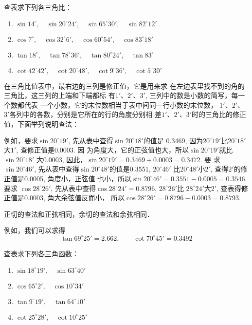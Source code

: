 \begin{ex}
    查表求下列各三角比：
\begin{enumerate}
    \item $\sin14^{\circ},\quad \sin20^{\circ}24',\quad \sin65^{\circ}30',\quad \sin82^{\circ}12'$
    \item $\cos7^{\circ},\quad  \cos32^{\circ}6',\quad  \cos60^{\circ}54',\quad \cos83^{\circ}18'$
    \item $\tan 18^{\circ},\quad  \tan 78^{\circ}36',\quad  \tan 80^{\circ}24',\quad  \tan 83^{\circ}$
    \item $\cot 42^{\circ}42',\quad   \cot20^{\circ}48', \quad  \cot9^{\circ}36', \quad  \cot 5^{\circ}30'$
\end{enumerate}
\end{ex}

在三角比值表中，最右边的三列是修正值，它是用来求
在左边表里找不到的角的三角比，这三列的上端和下端都标
有$1'$、$2'$、$3'$, 三列中的数是小数的简写，每一个数都代表
一个小数，它的末位数相当于表中间同一行小数的末位数，
$1'$、$2'$、$3'$各列中的各数，分别是它所在的行的角度分别相
差$1'$、$2'$、$3'$时的三角比的修正值，下面举列说明查法：

例如，要求$\sin20^{\circ}19'$, 先从表中查得$\sin20^{\circ}18'$的值是
0.3469, 因为$20^{\circ}19'$比$20^{\circ}18'$大$1'$, 查修正值是0.0003. 因
为角度大，它的正弦值也大，所以$\sin20^{\circ}19'$就比$\sin20^{\circ}18'$
大0.0003, 因此，$\sin20^{\circ}19'=0.3469+0.0003=0.3472$. 要
求$\sin20^{\circ}46'$, 先从表中查得$\sin20^{\circ}48'$的值是0.3551, $20^{\circ}46'$
比$20^{\circ}48'$小$2'$, 查得$2'$的修正值是0.0005, 角度小，正弦值
也小，所以$\sin20^{\circ}46'=0.3551-0.0005=0.3546$. 要求
$\cos28^{\circ}26'$, 先从表中查得$\cos28^{\circ}24'=0.8796$, $28^{\circ}26'$比
$28^{\circ}24'$大$2'$, 查表得修正值是0.0003, 角大余弦值反而小，
所以$\cos28^{\circ}26'=0.8796-0.0003=0.8793$. 

正切的查法和正弦相同，余切的查法和余弦相同．

例如，我们可以求得
\[\tan 69^{\circ}25'=2.662,\qquad \cot 70^{\circ}45'=0.3492\]

\begin{ex}
    查表求下列各三角函数：
\begin{multicols}{2}
    \begin{enumerate}
        \item $\sin18^{\circ}19',\quad  \sin63^{\circ}40'$
        \item $\cos65^{\circ}2',\quad  \cos10^{\circ}34'$
        \item $\tan 9^{\circ}19',\quad  \tan64^{\circ}10'$
        \item $\cot25^{\circ}28',\quad  \cot10^{\circ}25'$
    \end{enumerate}
\end{multicols}
\end{ex}

